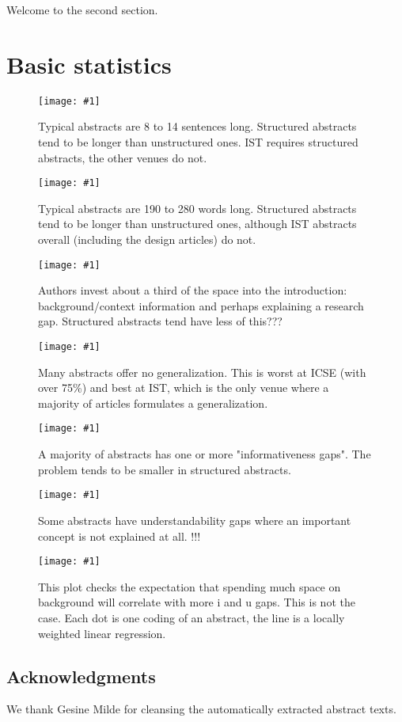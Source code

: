 \documentclass[journal]{IEEEtran}
\newcommand{\Plot}[2]{%
	\begin{figure}[!t]%
		\centering\texttt{[image: \#1]}%
		\vspace{-6mm}\caption{#2}\label{#1}%
	\end{figure}}
\begin{document}
\noindent Welcome to the second section.



\appendix
\section{Basic statistics}

\Plot{boxplots_sentences}{%
  Typical abstracts are 8 to 14 sentences long.
  Structured abstracts tend to be longer than unstructured ones.
  IST requires structured abstracts, the other venues do not.}
\Plot{boxplots_words}{%
  Typical abstracts are 190 to 280 words long. 
  Structured abstracts tend to be longer than unstructured ones, 
  although IST abstracts overall (including the design articles) do not.}
\Plot{boxplots_fraction_introduction}{%
  Authors invest about a third of the space into the introduction:
  background/context information and perhaps explaining a research gap.
  Structured abstracts tend have less of this???}
\Plot{boxplots_fraction_conclusion}{%
  Many abstracts offer no generalization.
  This is worst at ICSE (with over 75\%)
  and best at IST, which is the only venue where a majority of articles formulates a generalization.}
\Plot{boxplots_icount}{%
  A majority of abstracts has one or more "informativeness gaps".
  The problem tends to be smaller in structured abstracts.}
\Plot{boxplots_ucount}{%
  Some abstracts have understandability gaps where an important concept is not explained at all.
  !!!}
\Plot{lowess_gaps_by_fracintro}{%
  This plot checks the expectation that spending much space on background
  will correlate with more i and u gaps.
  This is not the case.
  Each dot is one coding of an abstract, 
  the line is a locally weighted linear regression.}



\subsection{Acknowledgments}
\noindent We thank Gesine Milde for cleansing the automatically extracted abstract texts.




\end{document}

